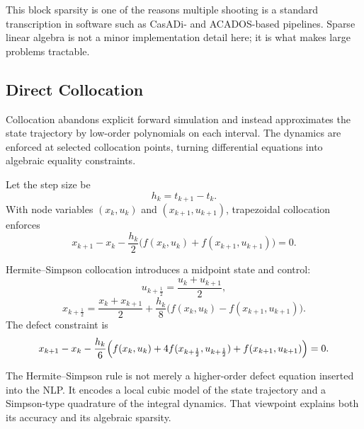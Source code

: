 \begin{remark}
	This block sparsity is one of the reasons multiple shooting is a standard transcription in software such as CasADi- and ACADOS-based pipelines. Sparse linear algebra is not a minor implementation detail here; it is what makes large problems tractable.
\end{remark}

\subsection{Direct Collocation}
\label{sec:l5-direct-collocation}

\begin{intuition}
	Collocation abandons explicit forward simulation and instead approximates the state trajectory by low-order polynomials on each interval. The dynamics are enforced at selected collocation points, turning differential equations into algebraic equality constraints.
\end{intuition}

\begin{definition}\label{def:l5-trapezoidal-collocation}
	Let the step size be
	\[
		h_k=t_{k+1}-t_k.
	\]
	With node variables $(x_k,u_k)$ and $(x_{k+1},u_{k+1})$, trapezoidal collocation enforces
	\[
		x_{k+1}-x_k-\frac{h_k}{2}\bigl(f(x_k,u_k)+f(x_{k+1},u_{k+1})\bigr)=0.
	\]
\end{definition}

\begin{definition}\label{def:l5-hermite-simpson-collocation}
	Hermite--Simpson collocation introduces a midpoint state and control:
	\[
		u_{k+\frac{1}{2}}=\frac{u_k+u_{k+1}}{2},
	\]
	\[
		x_{k+\frac{1}{2}}
		=
		\frac{x_k+x_{k+1}}{2}
		+
		\frac{h_k}{8}\bigl(f(x_k,u_k)-f(x_{k+1},u_{k+1})\bigr).
	\]
	The defect constraint is
	\[
		x_{k+1}-x_k
		-
		\frac{h_k}{6}
		\Bigl(
			f(x_k,u_k)+4f(x_{k+\frac{1}{2}},u_{k+\frac{1}{2}})+f(x_{k+1},u_{k+1})
		\Bigr)
		=0.
	\]
\end{definition}

\begin{remark}
	The Hermite--Simpson rule is not merely a higher-order defect equation inserted into the NLP. It encodes a local cubic model of the state trajectory and a Simpson-type quadrature of the integral dynamics. That viewpoint explains both its accuracy and its algebraic sparsity.
\end{remark}

